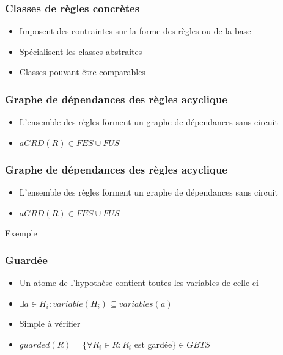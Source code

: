 
\begin{frame}
	\frametitle{Classes de règles concrètes}
	\vspace{10mm}
	\begin{itemize}
		\item Imposent des contraintes sur la forme des règles ou de la base
		\item Spécialisent les classes abstraites
		\item Classes pouvant être comparables
	\end{itemize}
	\vspace{10mm}
\end{frame}

\begin{frame}
	\frametitle{Graphe de dépendances des règles acyclique}
	\begin{itemize}
		\item L'ensemble des règles forment un graphe de dépendances sans circuit
		\item $aGRD(R) \in FES \cup FUS$
	\end{itemize}
	\vspace{10mm}
\end{frame}

\begin{frame}
	\frametitle{Graphe de dépendances des règles acyclique}
	\begin{itemize}
		\item L'ensemble des règles forment un graphe de dépendances sans circuit
		\item $aGRD(R) \in FES \cup FUS$
	\end{itemize}
	\vspace{10mm}
	\begin{exampleblock}{Exemple}
		 \\
	\end{exampleblock}
\end{frame}


\begin{frame}
	\frametitle{Guardée}
	\begin{itemize}
		\item Un atome de l'hypothèse contient toutes les variables de celle-ci
		\item $\exists a \in H_i : variable(H_i) \subseteq variables(a)$
		\item Simple à vérifier
		\item $guarded(R) = \{\forall R_i \in R : R_i $ est gardée$\} \in GBTS$
	\end{itemize}
	\vspace{10mm}
\end{frame}

